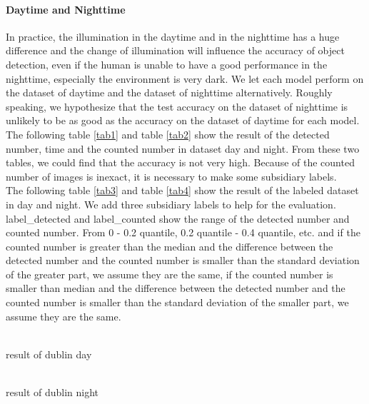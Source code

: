\documentclass[runningheads]{llncs}
\begin{document}
\paragraph{\textbf{Daytime and Nighttime}} In practice, the illumination in the daytime and in the nighttime has a huge difference and the change of illumination will influence the accuracy of object detection, even if the human is unable to have a good performance in the nighttime, especially the environment is very dark. We let each model perform on the dataset of daytime and the dataset of nighttime alternatively.  Roughly speaking, we hypothesize that the test accuracy on the dataset of nighttime is unlikely to be as good as the accuracy on the dataset of daytime for each model.\\



The following table \ref{tab1} and table \ref{tab2} show the result of the detected number, time and the counted number in dataset day and night. From these two tables, we could find that the accuracy is not very high. Because of the counted number of images is inexact, it is necessary to make some subsidiary labels.\\

The following table \ref{tab3} and table \ref{tab4} show the result of the labeled dataset in day and night. We add three subsidiary labels to help for the evaluation. label\_detected and label\_counted show the range of the detected number and counted number. From 0 - 0.2 quantile, 0.2 quantile - 0.4 quantile, etc. and if the counted number is greater than the median and the difference between the detected number and the counted number is smaller than the standard deviation of the greater part, we assume they are the same, if the counted number is smaller than median and the difference between the detected number and the counted number is smaller than the standard deviation of the smaller part, we assume they are the same.  


\begin{table}[H]
	\\
	\caption{result of dublin day}
	\label{tab1}
\end{table}
\begin{table}[H]
	\\
	\caption{result of dublin night}
	\label{tab2}
\end{table}
\end{document}

